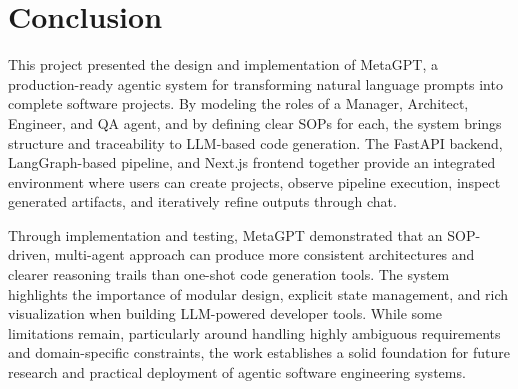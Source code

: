 
\chapter{Conclusion}

This project presented the design and implementation of MetaGPT, a production-ready agentic system for transforming natural language prompts into complete software projects. By modeling the roles of a Manager, Architect, Engineer, and QA agent, and by defining clear SOPs for each, the system brings structure and traceability to LLM-based code generation. The FastAPI backend, LangGraph-based pipeline, and Next.js frontend together provide an integrated environment where users can create projects, observe pipeline execution, inspect generated artifacts, and iteratively refine outputs through chat.

Through implementation and testing, MetaGPT demonstrated that an SOP-driven, multi-agent approach can produce more consistent architectures and clearer reasoning trails than one-shot code generation tools. The system highlights the importance of modular design, explicit state management, and rich visualization when building LLM-powered developer tools. While some limitations remain, particularly around handling highly ambiguous requirements and domain-specific constraints, the work establishes a solid foundation for future research and practical deployment of agentic software engineering systems.
